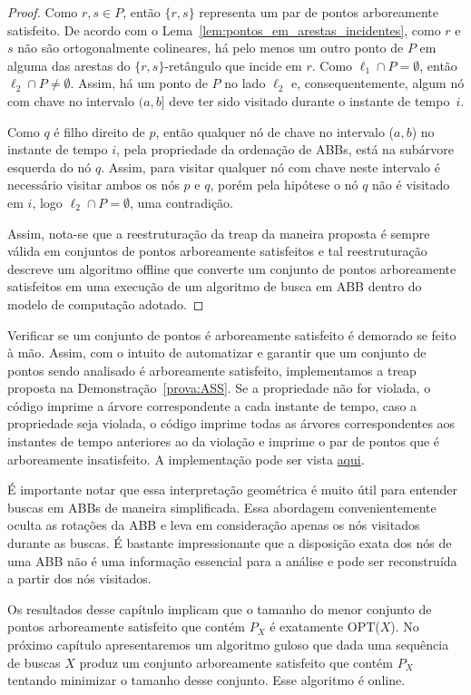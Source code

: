 \begin{proof}
Como $r,s \in P$, então $\{r,s\}$ representa um par de pontos arboreamente satisfeito. De acordo com o Lema~\ref{lem:pontos_em_arestas_incidentes}, como $r$ e $s$ não são ortogonalmente colineares, há pelo menos um outro ponto de $P$ em alguma das arestas do $\{r,s\}$-retângulo que incide em $r$. Como $\ell_1 \cap P = \emptyset$, então $\ell_2 \cap P \neq \emptyset$. Assim, há um ponto de $P$ no lado $\ell_2$ e, consequentemente, algum nó com chave no intervalo $(a,b]$ deve ter sido visitado durante o instante de tempo~$i$.

Como $q$ é filho direito de $p$, então qualquer nó de chave no intervalo ($a,b$) no instante de tempo $i$, pela propriedade da ordenação de ABBs, está na subárvore esquerda do nó $q$. Assim, para visitar qualquer nó com chave neste intervalo é necessário visitar ambos os nós $p$ e $q$, porém pela hipótese o nó $q$ não é visitado em $i$, logo $\ell_2 \cap P = \emptyset$, uma contradição.

Assim, nota-se que a reestruturação da treap da maneira proposta é sempre válida em conjuntos de pontos arboreamente satisfeitos e tal reestruturação descreve um algoritmo offline que converte um conjunto de pontos arboreamente satisfeitos em uma execução de um algoritmo de busca em ABB dentro do modelo de computação adotado.
\end{proof}

Verificar se um conjunto de pontos é arboreamente satisfeito é demorado se feito à mão. Assim, com o intuito de automatizar e garantir que um conjunto de pontos sendo analisado é arboreamente satisfeito, implementamos a treap proposta na Demonstração~\ref{prova:ASS}. %
Se a propriedade não for violada, o código imprime a árvore correspondente a cada instante de tempo, caso a propriedade seja violada, o código imprime todas as árvores correspondentes aos instantes de tempo anteriores ao da violação e imprime o par de pontos que é arboreamente insatisfeito. A implementação pode ser vista \href{https://github.com/BrunoArmondBraga/TCC/blob/main/src/ValidAss.cpp}{aqui}.

É importante notar que essa interpretação geométrica é muito útil para entender buscas em ABBs de maneira simplificada. Essa abordagem convenientemente oculta as rotações da ABB e leva em consideração apenas os nós visitados durante as buscas. É bastante impressionante que a disposição exata dos nós de uma ABB não é uma informação essencial para a análise e pode ser reconstruída a partir dos nós visitados.

Os resultados desse capítulo implicam que o tamanho do menor conjunto de pontos arboreamente satisfeito que contém $P_X$ é exatamente OPT($X$). No próximo capítulo apresentaremos um algoritmo guloso que dada uma sequência de buscas $X$ produz um conjunto arboreamente satisfeito que contém $P_X$ tentando minimizar o tamanho desse conjunto. Esse algoritmo é online.